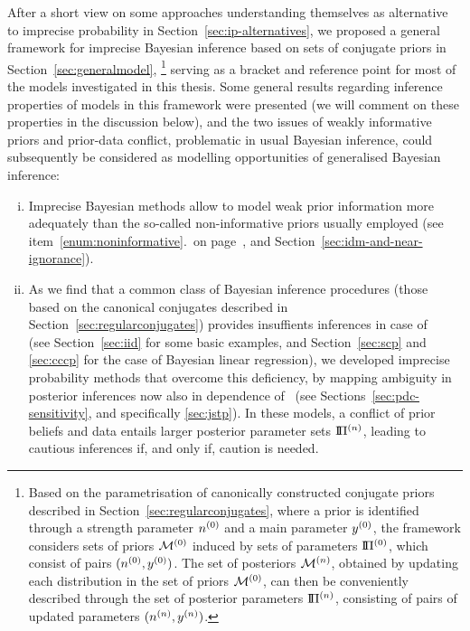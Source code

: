 After a short view on some approaches understanding themselves as alternative to imprecise probability in Section~\ref{sec:ip-alternatives},
we proposed a general framework for imprecise Bayesian inference
based on sets of conjugate priors in Section~\ref{sec:generalmodel},%
\footnote{Based on the parametrisation of canonically constructed conjugate priors described in Section~\ref{sec:regularconjugates},
where a prior is identified through a strength parameter $n^{(0)}$ and a main parameter $y^{(0)}$,
the framework considers sets of priors $\mathcal{M}^{(0)}$ induced by sets of parameters $\text{I}\!\Pi^{(0)}$, which consist of pairs $(n^{(0)},y^{(0)})$.
The set of posteriors $\mathcal{M}^{(n)}$, obtained by updating each distribution in the set of priors $\mathcal{M}^{(0)}$,
can then be conveniently described through the set of posterior parameters $\text{I}\!\Pi^{(n)}$,
consisting of pairs of updated parameters $(n^{(n)},y^{(n)})$.}
serving as a bracket and reference point for most of the models investigated in this thesis.
Some general results regarding inference properties of models
in this framework were presented (we will comment on these properties in the discussion below),
and the two issues of weakly informative priors and prior-data conflict,
problematic in usual Bayesian inference,
could subsequently be considered as modelling opportunities of generalised Bayesian inference:
\begin{enumerate}[(i)]
\item Imprecise Bayesian methods allow to model weak prior information
more adequately than the so-called non-informative priors usually employed 
(see item~\ref{enum:noninformative}.\ on page~\pageref{enum:noninformative}, and Section~\ref{sec:idm-and-near-ignorance}).
\item As we find that a common class of Bayesian inference procedures
(those based on the canonical conjugates described in Section~\ref{sec:regularconjugates})
provides insuffients inferences in case of \pdc\ %
(see Section~\ref{sec:iid} for some basic examples, and
Section~\ref{sec:scp} and \ref{sec:cccp} for the case of Bayesian linear regression),
we developed imprecise probability methods that overcome this deficiency,
by mapping ambiguity in posterior inferences now also in dependence of \pdc\ 
(see Sections~\ref{sec:pdc-sensitivity}, and specifically \ref{sec:jstp}).
In these models, a conflict of prior beliefs and data
entails larger posterior parameter sets $\text{I}\!\Pi^{(n)}$,
leading to cautious inferences if, and only if, caution is needed.
\end{enumerate}

